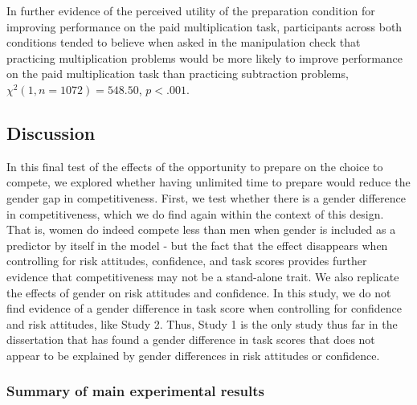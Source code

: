 \documentclass[letterpaper, nobind]{templates/ociamthesis}
\begin{document}
In further evidence of the perceived utility of the preparation condition for improving performance on the paid multiplication task, participants across both conditions tended to believe when asked in the manipulation check that practicing multiplication problems would be more likely to improve performance on the paid multiplication task than practicing subtraction problems, \(\chi^2(1, n = 1072) = 548.50\), \(p < .001\).

\hypertarget{discussion-2}{%
\subsection{Discussion}\label{discussion-2}}

In this final test of the effects of the opportunity to prepare on the choice to compete, we explored whether having unlimited time to prepare would reduce the gender gap in competitiveness. First, we test whether there is a gender difference in competitiveness, which we do find again within the context of this design. That is, women do indeed compete less than men when gender is included as a predictor by itself in the model - but the fact that the effect disappears when controlling for risk attitudes, confidence, and task scores provides further evidence that competitiveness may not be a stand-alone trait. We also replicate the effects of gender on risk attitudes and confidence. In this study, we do not find evidence of a gender difference in task score when controlling for confidence and risk attitudes, like Study 2. Thus, Study 1 is the only study thus far in the dissertation that has found a gender difference in task scores that does not appear to be explained by gender differences in risk attitudes or confidence.

\hypertarget{summary-of-main-experimental-results-2}{%
\subsubsection{Summary of main experimental results}\label{summary-of-main-experimental-results-2}}
\end{document}
